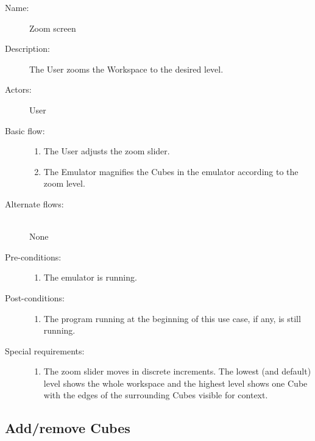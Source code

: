 \documentclass[12pt]{article}
\begin{document}
    \begin{description}
      \item[Name:] Zoom screen
      \item[Description:] The User zooms the Workspace to the desired level.
      \item[Actors:] User
      \item[Basic flow:] \hfill
        \begin{enumerate}
	  \item{The User adjusts the zoom slider.}
	  \item{The Emulator magnifies the Cubes in the emulator according to the zoom level.}
        \end{enumerate}
      \item[Alternate flows:] \hfill \\
	None
      \item[Pre-conditions:] \hfill
        \begin{enumerate}
          \item{The emulator is running.}
        \end{enumerate}
      \item[Post-conditions:] \hfill
        \begin{enumerate}
	  \item{The program running at the beginning of this use case, if any, is still running.}
        \end{enumerate}
	  \item[Special requirements:] \hfill
        \begin{enumerate}
		\item{The zoom slider moves in discrete increments. The lowest (and default) level shows the whole workspace and the highest level shows one Cube with the edges of the surrounding Cubes visible for context.}
		\end{enumerate}
    \end{description}	

  \subsection{Add/remove Cubes}
\end{document}
